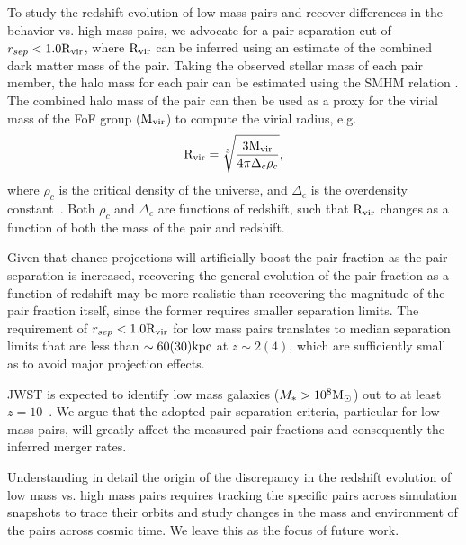 \documentclass[twocolumn]{aastex631}
\newcommand{\Rvir}{\ensuremath{\rm R_{vir}}}
\begin{document}
    To study the redshift evolution of low mass pairs and recover differences in the behavior vs. high mass pairs, we advocate for a pair separation cut of  $r_{sep} < 1.0\Rvir$, where $\Rvir$ can be inferred using an estimate of the combined dark matter mass of the pair.
    Taking the observed stellar mass of each pair member, the halo mass for each pair can be estimated using the SMHM relation \citep[e.g.,][]{Moster2013}. 
    The combined halo mass of the pair can then be used as a proxy for the virial mass of the FoF group ($\rm M_{vir}$) to compute the virial radius, e.g. 
    \begin{equation}\label{eq}
    \Rvir = \sqrt[3]{\frac{3\rm M_{vir}}{4\pi \Delta_{c}\rho_{c}}},
    \end{equation}
    where $\rho_c$ is the critical density of the universe, and $\Delta_{c}$ is the overdensity constant~\citep[see][]{BinneyTremaine2008}. 
    Both $\rho_c$ and $\Delta_{c}$ are functions of redshift, such that $\Rvir$ changes as a function of both the mass of the pair and redshift.
    
    Given that chance projections will artificially boost the pair fraction as the pair separation is increased, recovering the general evolution of the pair fraction as a function of redshift may be more realistic than recovering the magnitude of the pair fraction itself, since the former requires smaller separation limits. 
    The requirement of $r_{sep} < 1.0\Rvir$ for low mass pairs translates to median separation limits that are less than $\sim 60(30)\mathrm{kpc}$ at $z \sim2(4)$, which are sufficiently small as to avoid major projection effects. 

    JWST is expected to identify low mass galaxies ($M_* > 10^8\mathrm{M}_\odot$) out to at least $z=10$~\citep{Behroozi2020}. 
    We argue that the adopted pair separation criteria, particular for low mass pairs, will greatly affect the measured pair fractions and consequently the inferred merger rates. 

    Understanding in detail the origin of the discrepancy in the redshift evolution of low mass vs. high mass pairs requires tracking the specific pairs across simulation snapshots to trace their orbits and study changes in the mass and environment of the pairs across cosmic time.  
    We leave this as the focus of future work.
\end{document}
